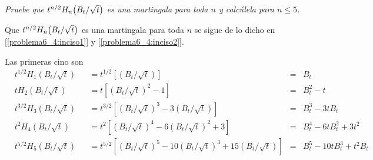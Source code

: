 \emph{
    Pruebe que $t^{n/2}H_n\!\left( B_t/\sqrt{t}\right) $ es una martingala para 
    toda $n$ y calc\'ulela para $n\leq 5$.\pn
}

\afterstatement\pn

Que $t^{n/2}H_n\!\left( B_t/\sqrt{t}\right) $ es una martingala para toda $n$ se 
sigue de lo dicho en [\ref{problema6_4:inciso1}] y [\ref{problema6_4:inciso2}].\pn

Las primeras cino son
\scriptsize
\begin{align}
        &t^{1/2} H_1(B_t/\sqrt{t})   &&=  t^{1/2}\left[(B_t/\sqrt{t})\right] &=& B_t                      \\
        &t H_2(B_t/\sqrt{t})         &&=  t\left[(B_t/\sqrt{t})^2 - 1\right] &=& B_t^2 - t               \\
        &t^{3/2} H_3(B_t/\sqrt{t})   &&=  t^{3/2}\left[(B_t/\sqrt{t})^3 - 3(B_t/\sqrt{t})\right] &=& B_t^3 - 3t B_t               \\
        &t^{2} H_4(B_t/\sqrt{t})     &&=  t^{2}\left[(B_t/\sqrt{t})^4 - 6(B_t/\sqrt{t})^2 + 3\right] &=& B_t^4 - 6t B_t^2 + 3t^2         \\
        &t^{5/2} H_5(B_t/\sqrt{t})   &&=  t^{5/2}\left[(B_t/\sqrt{t})^5 - 10(B_t/\sqrt{t})^3 + 15(B_t/\sqrt{t})\right] &=& B_t^5 - 10t B_t^3 + t^2 B_t      \\
\end{align}
\normalsize